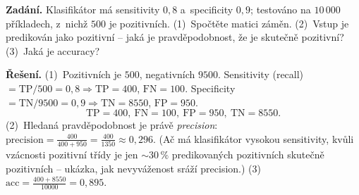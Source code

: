 \begin{priklad}
\par
\textbf{Zadání.} Klasifikátor má sensitivity $0{,}8$ a~specificity $0{,}9$; testováno na $10\,000$ příkladech, z~nichž $500$ je pozitivních. (1)~Spočtěte matici záměn. (2)~Vstup je predikován jako pozitivní -- jaká je pravděpodobnost, že je skutečně pozitivní? (3)~Jaká je accuracy?

\smallskip
\textbf{Řešení.} (1)~Pozitivních je $500$, negativních $9500$. Sensitivity (recall) $=\mathrm{TP}/500=0{,}8\Rightarrow \mathrm{TP}=400$, $\mathrm{FN}=100$. Specificity $=\mathrm{TN}/9500=0{,}9\Rightarrow \mathrm{TN}=8550$, $\mathrm{FP}=950$.
\[ \mathrm{TP}=400,\ \mathrm{FN}=100,\ \mathrm{FP}=950,\ \mathrm{TN}=8550. \]
(2)~Hledaná pravděpodobnost je právě \emph{precision}: $\text{precision}=\frac{400}{400+950}=\frac{400}{1350}\approx\boxed{0{,}296}$. (Ač má klasifikátor vysokou sensitivity, kvůli vzácnosti pozitivní třídy je jen $\sim\!30\,\%$ predikovaných pozitivních skutečně pozitivních -- ukázka, jak nevyváženost sráží precision.) (3)~$\mathrm{acc}=\frac{400+8550}{10000}=\boxed{0{,}895}$.
\end{priklad}


